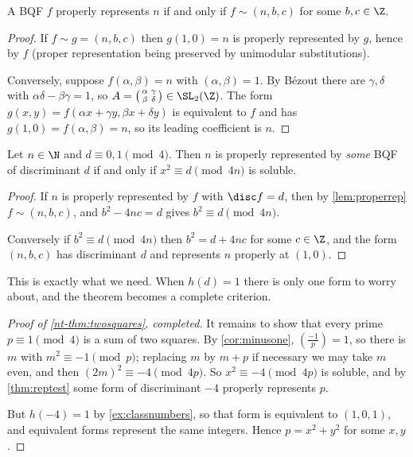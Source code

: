 \begin{lemma}\label{lem:properrep}
	A BQF $f$ properly represents $n$ if and only if $f \sim (n, b, c)$ for some $b, c \in \Z$.
\end{lemma}
\begin{proof}
	If $f \sim g = (n, b, c)$ then $g(1, 0) = n$ is properly represented by $g$, hence by $f$ (proper representation being preserved by unimodular substitutions).

	Conversely, suppose $f(\alpha, \beta) = n$ with $(\alpha, \beta) = 1$. By Bézout there are $\gamma, \delta$ with $\alpha\delta - \beta\gamma = 1$, so $A = \left(\begin{smallmatrix} \alpha & \gamma \\ \beta & \delta \end{smallmatrix}\right) \in \SL_2(\Z)$. The form $g(x,y) = f(\alpha x + \gamma y, \beta x + \delta y)$ is equivalent to $f$ and has $g(1,0) = f(\alpha,\beta) = n$, so its leading coefficient is $n$.
\end{proof}

\begin{theorem}\label{thm:reptest}
	Let $n \in \N$ and $d \equiv 0, 1 \pmod 4$. Then $n$ is properly represented by \emph{some} BQF of discriminant $d$ if and only if $x^2 \equiv d \pmod{4n}$ is soluble.
\end{theorem}
\begin{proof}
	If $n$ is properly represented by $f$ with $\disc f = d$, then by \autoref{lem:properrep} $f \sim (n, b, c)$, and $b^2 - 4nc = d$ gives $b^2 \equiv d \pmod {4n}$.

	Conversely if $b^2 \equiv d \pmod{4n}$ then $b^2 = d + 4nc$ for some $c \in \Z$, and the form $(n, b, c)$ has discriminant $d$ and represents $n$ properly at $(1,0)$.
\end{proof}

This is exactly what we need. When $h(d) = 1$ there is only one form to worry about, and the theorem becomes a complete criterion.

\begin{proof}[Proof of \autoref{nt-thm:twosquares}, completed]
	It remains to show that every prime $p \equiv 1 \pmod 4$ is a sum of two squares. By \autoref{cor:minusone}, $\left( \frac{-1}p \right) = 1$, so there is $m$ with $m^2 \equiv -1 \pmod p$; replacing $m$ by $m + p$ if necessary we may take $m$ even, and then $(2m)^2 \equiv -4 \pmod{4p}$. So $x^2 \equiv -4 \pmod{4p}$ is soluble, and by \autoref{thm:reptest} some form of discriminant $-4$ properly represents $p$.

	But $h(-4) = 1$ by \autoref{ex:classnumbers}, so that form is equivalent to $(1,0,1)$, and equivalent forms represent the same integers. Hence $p = x^2 + y^2$ for some $x, y$.
\end{proof}


